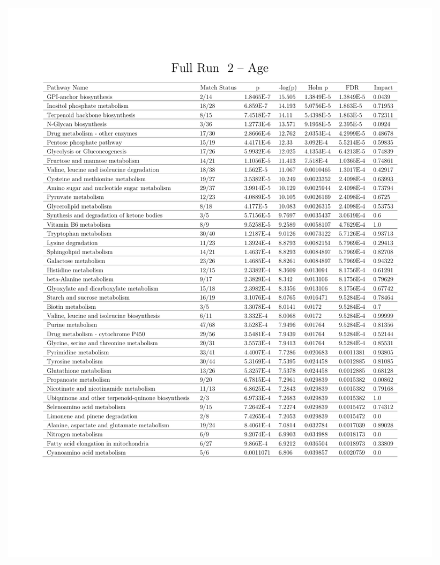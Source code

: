 \documentclass[a4paper,11pt,twoside]{book}
\begin{document}
\begin{subappendices}
\begin{figure}
	\centering
	\includegraphics[width=\linewidth]{3.Metabolomics/MSEA_charts_3.pdf}
\end{figure}


\end{subappendices}
\end{document}
